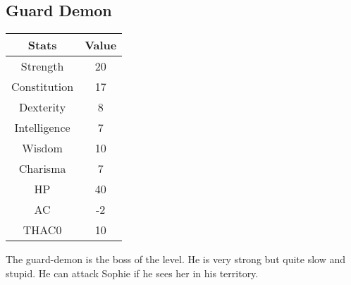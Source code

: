 \subsection{Guard Demon}
\begin{table}[H]
\begin{tabular}{|c|c|}
\hline
\rowcolor[HTML]{C0C0C0} 
\textbf{Stats} & \textbf{Value} \\ \hline
Strength & 20 \\ \hline
Constitution & 17 \\ \hline
Dexterity & 8 \\ \hline
Intelligence & 7 \\ \hline
Wisdom & 10 \\ \hline
Charisma & 7 \\ \hline
HP & 40 \\ \hline
AC & -2 \\ \hline
THAC0 & 10 \\ \hline
\end{tabular}
\end{table}
The guard-demon is the boss of the level. He is very strong but quite slow and stupid.
He can attack Sophie if he sees her in his territory. 
